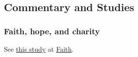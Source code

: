 	
	
	
	
\subsection{Commentary and Studies} %
	\label{HOPE-COMMENTARY}

	
		
	\subsubsection{Faith, hope, and charity}
	
		See \hyperref[FAITH-hope-charity]{this study} at \hyperref[FAITH]{Faith}.
		
